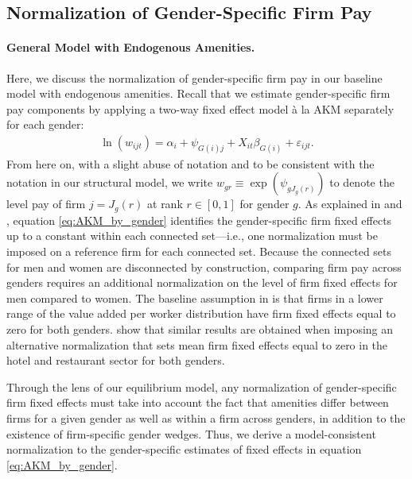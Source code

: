 \subsection{Normalization of Gender-Specific Firm Pay\label{subsec:norm_firm_pay}}

\paragraph{General Model with Endogenous Amenities.}

Here, we discuss the normalization of gender-specific firm pay in our baseline model with endogenous amenities. Recall that we estimate gender-specific firm pay components by applying a two-way fixed effect model {\`{a}} la AKM separately for each gender:
%
\begin{align}
    \ln( w_{ijt} ) = \alpha_{i} + \psi_{G(i) j} + X_{it}\beta_{G(i)} + \varepsilon_{ijt}. \label{eq:AKM_by_gender}
\end{align}
%
From here on, with a slight abuse of notation and to be consistent with the notation in our structural model, we write $w_{gr} \equiv \exp( \psi_{gJ_{g}(r)} )$ to denote the level pay of firm $j = J_{g}(r)$ at rank $r \in [0,1]$ for gender $g$. %
%
As explained in \citet{AbowdCreecyKramarz2002} and \citet{CardCardosoKline2016}, equation \eqref{eq:AKM_by_gender} identifies the gender-specific firm fixed effects up to a constant within each connected set---i.e., one normalization must be imposed on a reference firm for each connected set. Because the connected sets for men and women are disconnected by construction, comparing firm pay across genders requires an additional normalization on the level of firm fixed effects for men compared to women. The baseline assumption in \citet{CardCardosoKline2016} is that firms in a lower range of the value added per worker distribution have firm fixed effects equal to zero for both genders. \citet{CardCardosoKline2016} show that similar results are obtained when imposing an alternative normalization that sets mean firm fixed effects equal to zero in the hotel and restaurant sector for both genders.

Through the lens of our equilibrium model, any normalization of gender-specific firm fixed effects must take into account the fact that amenities differ between firms for a given gender as well as within a firm across genders, in addition to the existence of firm-specific gender wedges. Thus, we derive a model-consistent normalization to the gender-specific estimates of fixed effects in equation \eqref{eq:AKM_by_gender}.

